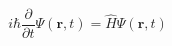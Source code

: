 \documentclass{article}
\begin{document}
    $$i\hbar \frac{\partial}{\partial t}\Psi(\mathbf{r},t) = \hat{H} \Psi(\mathbf{r},t)$$
 
\end{document}
